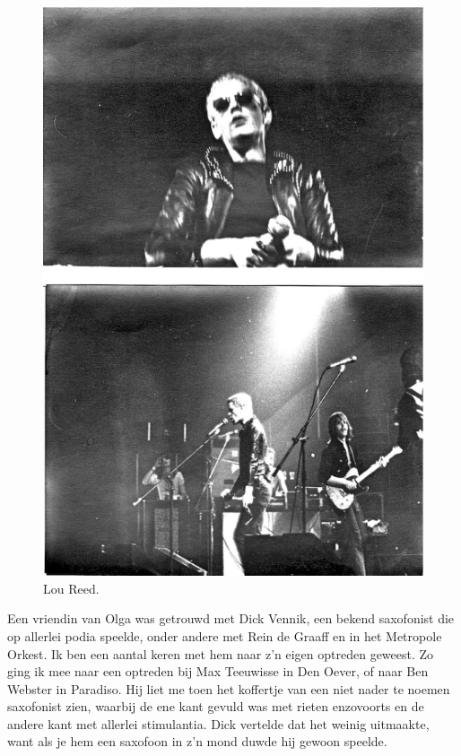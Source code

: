 \documentclass[10pt,twoside, openright]{memoir}
\begin{document}
\begin{figure}
\includegraphics[width=\textwidth]{img/ch31/reed}
\caption*{\footnotesize Lou Reed.}
\end{figure}

Een vriendin van Olga was getrouwd met Dick Vennik, een bekend saxofonist die op allerlei podia speelde, onder andere met Rein de Graaff en in het Metropole Orkest. Ik ben een aantal keren met hem naar z’n eigen optreden geweest. Zo ging ik mee naar een optreden bij Max Teeuwisse in Den Oever, of naar Ben Webster in Paradiso. Hij liet me toen het koffertje van een niet nader te noemen saxofonist zien, waarbij de ene kant gevuld was met rieten enzovoorts en de andere kant met allerlei stimulantia. Dick vertelde dat het weinig uitmaakte, want als je hem een saxofoon in z’n mond duwde hij gewoon speelde.
\end{document}
